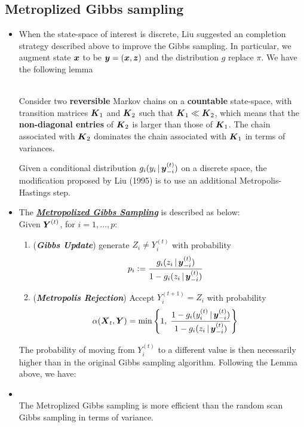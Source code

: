 \documentclass[11pt]{article}
\begin{document}
\subsection{Metroplized Gibbs sampling}
\begin{itemize}
\item When the state-space of interest is discrete, Liu suggested an completion strategy described above to improve the Gibbs sampling. In particular, we augment state $\boldsymbol{x}$ to be $\boldsymbol{y} = (\boldsymbol{x}, \boldsymbol{z})$ and the distribution $g$ replace $\pi$. We have the following lemma
\begin{lemma}\citep{robert1999monte}\\
Consider two \textbf{reversible} Markov chains on a \textbf{countable} state-space, with transition matrices $\boldsymbol{K}_1$ and $\boldsymbol{K}_2$ such that $\boldsymbol{K}_1 \ll \boldsymbol{K}_2$, which means that the \textbf{non-diagonal entries} of $\boldsymbol{K}_2$ is larger than those of $\boldsymbol{K}_1$. The chain associated with $\boldsymbol{K}_2$ dominates the chain associated with $\boldsymbol{K}_1$ in terms of variances.
\end{lemma}
Given a conditional distribution $g_i(y_i \,|\, \boldsymbol{y}_{-i}^{(t)})$ on a discrete space, the modification proposed by Liu (1995) is to use an additional Metropolis-Hastings step.

\item The \underline{\emph{\textbf{Metropolized Gibbs Sampling}}} \citep{robert1999monte, liu2001monte} is described as below: \\

Given $\boldsymbol{Y}^{(t)}$, for $i=1,\ldots, p$:
\begin{enumerate}
\item (\emph{\textbf{Gibbs Update}}) generate $Z_i \neq Y_{i}^{(t)}$ with probability
\begin{align*}
p_i &:= \frac{g_i(z_i \,|\, \boldsymbol{y}_{-i}^{(t)})}{1 - g_i(z_i \,|\, \boldsymbol{y}_{-i}^{(t)})}
\end{align*}

\item (\emph{\textbf{Metropolis Rejection}}) Accept $Y_{i}^{(t+1)} = Z_i$ with probability 
\begin{align*}
\alpha(\boldsymbol{X}_{t}, \boldsymbol{Y}) &= \min\left\{1,\;\frac{1 - g_i(y_i^{(t)} \,|\, \boldsymbol{y}_{-i}^{(t)})}{1 - g_i(z_i \,|\, \boldsymbol{y}_{-i}^{(t)})}\right\}
\end{align*}
\end{enumerate}

The probability of moving from $Y_i^{(t)}$ to a different value is then necessarily higher than in the original Gibbs sampling algorithm. Following the Lemma above, we have:

\item \begin{theorem}\citep{robert1999monte}\\
The Metroplized Gibbs sampling is more efficient than the random scan Gibbs sampling in terms of variance.
\end{theorem}

\end{itemize}


\newpage


\end{document}
